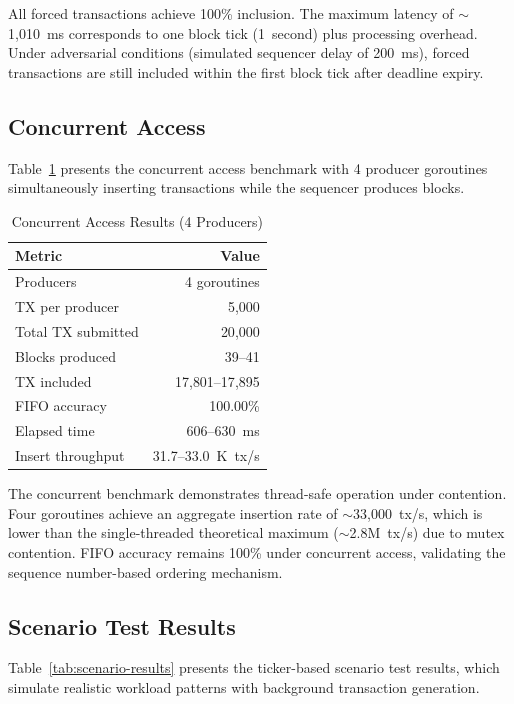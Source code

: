 All forced transactions achieve 100\% inclusion. The maximum latency of
${\sim}$1{,}010~ms corresponds to one block tick (1~second) plus processing overhead.
Under adversarial conditions (simulated sequencer delay of 200~ms), forced transactions
are still included within the first block tick after deadline expiry.

\subsection{Concurrent Access}

Table~\ref{tab:concurrent-results} presents the concurrent access benchmark with
4 producer goroutines simultaneously inserting transactions while the sequencer
produces blocks.

\begin{table}[htbp]
\caption{Concurrent Access Results (4 Producers)}
\label{tab:concurrent-results}
\centering
\begin{tabular}{lr}
\toprule
\textbf{Metric} & \textbf{Value} \\
\midrule
Producers & 4 goroutines \\
TX per producer & 5{,}000 \\
Total TX submitted & 20{,}000 \\
Blocks produced & 39--41 \\
TX included & 17{,}801--17{,}895 \\
FIFO accuracy & 100.00\% \\
Elapsed time & 606--630~ms \\
Insert throughput & 31.7--33.0~K~tx/s \\
\bottomrule
\end{tabular}
\end{table}

The concurrent benchmark demonstrates thread-safe operation under contention.
Four goroutines achieve an aggregate insertion rate of ${\sim}$33{,}000~tx/s,
which is lower than the single-threaded theoretical maximum (${\sim}$2.8M~tx/s)
due to mutex contention. FIFO accuracy remains 100\% under concurrent access,
validating the sequence number-based ordering mechanism.

\subsection{Scenario Test Results}

Table~\ref{tab:scenario-results} presents the ticker-based scenario test results,
which simulate realistic workload patterns with background transaction generation.

